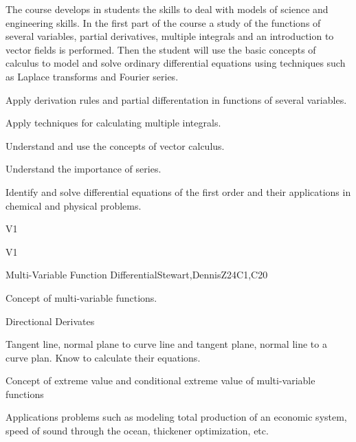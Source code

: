 \begin{syllabus}


\begin{justification}

The course develops in students the skills to deal with models of science and engineering skills. In the first part
of the course a study of the functions of several variables, partial derivatives, multiple integrals and an
introduction to vector fields is performed. Then the student will use the basic concepts of calculus to model
and solve ordinary differential equations using techniques such as Laplace transforms and Fourier series.
\end{justification}

\begin{goals}
  \item Apply derivation rules and partial differentation in functions of several variables.
  \item Apply techniques for calculating multiple integrals.
  \item Understand and use the concepts of vector calculus.
  \item Understand the importance of series.
  \item Identify and solve differential equations of the first order and their applications in chemical and physical problems.
\end{goals}

\begin{outcomes}{V1}
    \item {}  
    \item {}
\end{outcomes}

\begin{competences}{V1}
    \item {}
    \item {}
\end{competences}

\begin{unit}{Multi-Variable Function Differential}{}{Stewart,DennisZ}{24}{C1,C20}
   \begin{topics}      
    \item Concept of multi-variable functions.
    \item Directional Derivates
    \item Tangent line, normal plane to curve line and tangent plane, normal line to a curve plan. Know to calculate their equations.
    \item Concept of extreme value and conditional extreme value of multi-variable functions
    \item Applications problems such as modeling total production of an economic system, speed of sound through the ocean, thickener optimization, etc.
      \end{topics}


\end{unit}
\end{syllabus}

